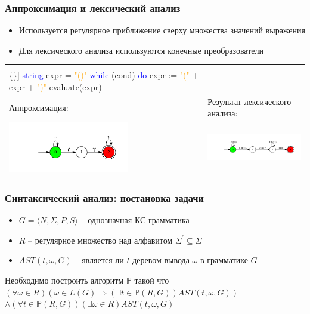 \documentclass{beamer}
\begin{document}
\begin{frame}[fragile]
    \transwipe[direction=90]
    \frametitle{Аппроксимация и лексический анализ}    
    \begin{itemize}    
        \item Используется регулярное приближение сверху множества значений выражения  
        \item Для лексического анализа используются конечные преобразователи
    \end{itemize}

\begin{center}
    \begin{tabular}{p{6cm}|p{6cm}}
    \begin{minipage}{3in}

        \begin{Verbatim}[commandchars=\\\{\}]
\textcolor{blue}{string} expr = \textcolor{orange}{"()"}
\textcolor{blue}{while} (cond) \textcolor{blue}{do} 
    expr := \textcolor{orange}{"("} + expr + \textcolor{orange}{")"}
\underline{evaluate(expr)}  
        \end{Verbatim}
    \end{minipage}
&
\\      
Аппроксимация: & Результат лексического анализа:
\\
\includegraphics[width=150pt]{pictures/in3_appr.pdf}
&
\includegraphics[width=160pt]{pictures/in3.pdf}

    \end{tabular}
\end{center}
\end{frame}

\begin{frame}
    \transwipe[direction=90]
    \frametitle{Синтаксический анализ: постановка задачи}
    \begin{itemize}    
        \item $G=\langle N,\Sigma, P,S\rangle$ -- однозначная КС грамматика
        \item $R$ -- регулярное множество над алфавитом ${\Sigma}^{'} \subseteq \Sigma $
        \item $AST(t,\omega,G)$ -- является ли $t$ деревом вывода $\omega$ в грамматике $G$
    \end{itemize}
    Необходимо построить алгоритм $\mathbb{P}$ такой что
    $(\forall \omega \in R) (\omega \in L(G) \Rightarrow (\exists t \in \mathbb{P}(R,G))AST(t, \omega, G))$
    $\land (\forall t \in \mathbb{P}(R,G))(\exists \omega \in R)AST(t,\omega,G)$
\end{frame}
\end{document}
